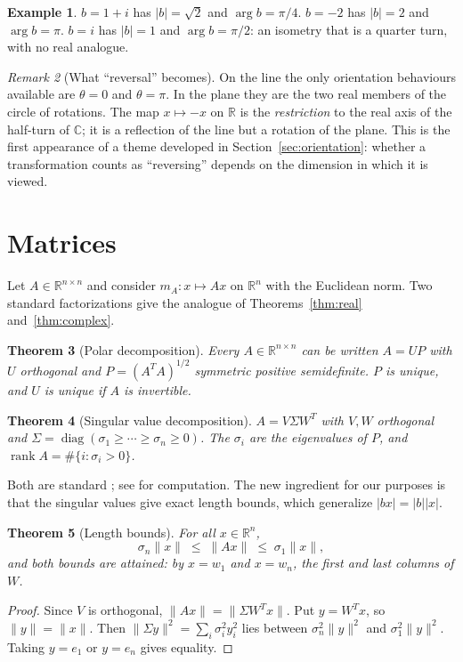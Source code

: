 \documentclass[12pt]{article}
\newtheorem{theorem}{Theorem}
\theoremstyle{definition}
\newtheorem{example}[theorem]{Example}
\theoremstyle{remark}
\newtheorem{remark}[theorem]{Remark}
\newcommand{\R}{\mathbb{R}}
\newcommand{\C}{\mathbb{C}}
\newcommand{\rank}{\operatorname{rank}}
\newcommand{\norm}[1]{\lVert #1\rVert}
\begin{document}
\begin{example}\label{ex:complex}
$b=1+i$ has $|b|=\sqrt2$ and $\arg b=\pi/4$. $b=-2$ has $|b|=2$ and $\arg b=\pi$. $b=i$ has $|b|=1$ and $\arg b=\pi/2$: an isometry that is a quarter turn, with no real analogue.
\end{example}

\begin{remark}[What ``reversal'' becomes]
On the line the only orientation behaviours available are $\theta=0$ and $\theta=\pi$. In the plane they are the two real members of the circle of rotations. The map $x\mapsto -x$ on $\R$ is the \emph{restriction} to the real axis of the half-turn of $\C$; it is a reflection of the line but a rotation of the plane. This is the first appearance of a theme developed in Section~\ref{sec:orientation}: whether a transformation counts as ``reversing'' depends on the dimension in which it is viewed.
\end{remark}

\section{Matrices}\label{sec:matrix}
Let $A\in\R^{n\times n}$ and consider $m_A:x\mapsto Ax$ on $\R^n$ with the Euclidean norm. Two standard factorizations \cite{horn2013,golub2013} give the analogue of Theorems~\ref{thm:real} and~\ref{thm:complex}.

\begin{theorem}[Polar decomposition]\label{thm:polar}
Every $A\in\R^{n\times n}$ can be written $A=UP$ with $U$ orthogonal and $P=(A^TA)^{1/2}$ symmetric positive semidefinite. $P$ is unique, and $U$ is unique if $A$ is invertible.
\end{theorem}

\begin{theorem}[Singular value decomposition]\label{thm:svd}
$A=V\Sigma W^T$ with $V,W$ orthogonal and $\Sigma=\operatorname{diag}(\sigma_1\ge\cdots\ge\sigma_n\ge0)$. The $\sigma_i$ are the eigenvalues of $P$, and $\rank A=\#\{i:\sigma_i>0\}$.
\end{theorem}

Both are standard \cite{horn2013}; see \cite{higham1986} for computation. The new ingredient for our purposes is that the singular values give exact length bounds, which generalize $|bx|=|b||x|$.

\begin{theorem}[Length bounds]\label{thm:bounds}
For all $x\in\R^n$,
\[
\sigma_n\norm{x}\;\le\;\norm{Ax}\;\le\;\sigma_1\norm{x},
\]
and both bounds are attained: by $x=w_1$ and $x=w_n$, the first and last columns of $W$.
\end{theorem}
\begin{proof}
Since $V$ is orthogonal, $\norm{Ax}=\norm{\Sigma W^Tx}$. Put $y=W^Tx$, so $\norm{y}=\norm{x}$. Then $\norm{\Sigma y}^2=\sum_i\sigma_i^2y_i^2$ lies between $\sigma_n^2\norm{y}^2$ and $\sigma_1^2\norm{y}^2$. Taking $y=e_1$ or $y=e_n$ gives equality.
\end{proof}
\end{document}

